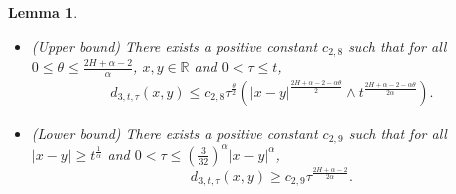 \documentclass[10pt,a4paper]{amsart}
\newtheorem{lemma}{Lemma}
\begin{document}
 \begin{lemma}\label{lem:diff3} 
\begin{itemize}
\item[(a)] (Upper bound)   There exists a positive constant $c_{2,8}$ such that for all   $0 \leq \theta \leq \frac{2H + \alpha - 2}{\alpha}$,  $x, y \in \mathbb{R}$ and   $0 < \tau \leq t$,
 \begin{align}\label{U-h-dEu 3-0}
   d_{3, t,\tau}(x,y)\leq c_{2,8} \tau^{\frac{\theta}{2}} \left(|x-y|^{\frac{2H+\alpha-2-\alpha\theta}{2}}\wedge t^{\frac{2H+\alpha-2-\alpha\theta}{2\alpha}}\right).
 \end{align}
 \item[(b)] (Lower bound)
 There exists a positive constant $c_{2,9}$ such that for all $|x-y|\geq t^{\frac1{\alpha}}$
  and $0 < \tau \leq \left(\frac{3}{32}\right)^{\alpha}|x-y|^{\alpha}$,
\begin{equation}\label{U-h-dEu 3}
       d_{3, t,\tau}(x,y)\geq  c_{2,9} \tau^{\frac{2H+\alpha-2}{2\alpha}}.
  \end{equation}
  \end{itemize}
  \end{lemma}
\end{document}
